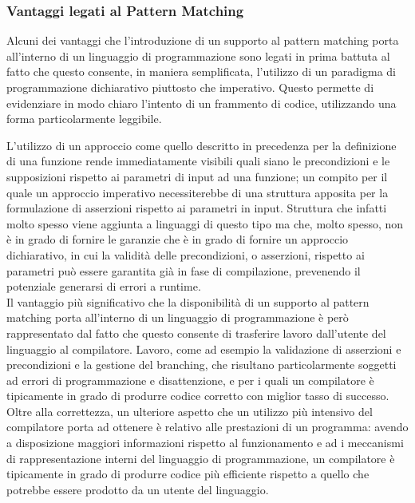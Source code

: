 \subsubsection{Vantaggi legati al Pattern Matching}

Alcuni dei vantaggi che l'introduzione di un supporto al pattern matching porta
all’interno di un linguaggio di programmazione sono legati in prima battuta al
fatto che questo consente, in maniera semplificata, l’utilizzo di un paradigma
di programmazione dichiarativo piuttosto che imperativo. Questo permette di
evidenziare in modo chiaro l’intento di un frammento di codice, utilizzando una
forma particolarmente leggibile.

L’utilizzo di un approccio come quello descritto in precedenza per la
definizione di una funzione rende immediatamente visibili quali siano le
precondizioni e le supposizioni rispetto ai parametri di input ad una funzione;
un compito per il quale un approccio imperativo necessiterebbe di una struttura
apposita per la formulazione di asserzioni rispetto ai parametri in input.
Struttura che infatti molto spesso viene aggiunta a linguaggi di questo tipo ma
che, molto spesso, non è in grado di fornire le garanzie che è in grado di
fornire un approccio dichiarativo, in cui la validità delle precondizioni, o
asserzioni, rispetto ai parametri può essere garantita già in fase di
compilazione, prevenendo il potenziale generarsi di errori a runtime.\\

Il vantaggio più significativo che la disponibilità di un supporto al pattern
matching porta all’interno di un linguaggio di programmazione è però
rappresentato dal fatto che questo consente di trasferire lavoro dall’utente del
linguaggio al compilatore. Lavoro, come ad esempio la validazione di asserzioni
e precondizioni e la gestione del branching, che risultano particolarmente
soggetti ad errori di programmazione e disattenzione, e per i quali un
compilatore è tipicamente in grado di produrre codice corretto con miglior tasso
di successo. Oltre alla correttezza, un ulteriore aspetto che un utilizzo più
intensivo del compilatore porta ad ottenere è relativo alle prestazioni di un
programma: avendo a disposizione maggiori informazioni rispetto al funzionamento
e ad i meccanismi di rappresentazione interni del linguaggio di programmazione,
un compilatore è tipicamente in grado di produrre codice più efficiente rispetto
a quello che potrebbe essere prodotto da un utente del linguaggio.\\

